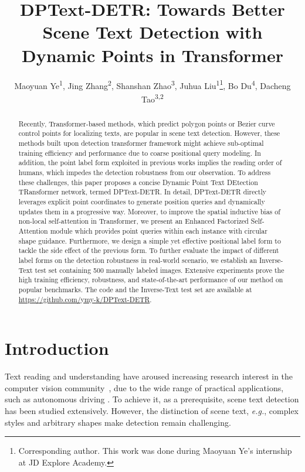 \documentclass[letterpaper]{article} \usepackage{aaai23}  \usepackage{times}  \usepackage{helvet}  \usepackage{courier}  \usepackage[hyphens]{url}  \usepackage{graphicx} \urlstyle{rm}
\title{
DPText-DETR: Towards Better Scene Text Detection with Dynamic Points in Transformer
}
\author {
    Maoyuan Ye\textsuperscript{\rm 1},
    Jing Zhang\textsuperscript{\rm 2},
    Shanshan Zhao\textsuperscript{\rm 3},
    Juhua Liu\textsuperscript{\rm 1}\footnote{Corresponding author. This work was done during Maoyuan Ye’s internship at JD Explore Academy.},
    Bo Du\textsuperscript{\rm 4}\footnotemark[1],
    Dacheng Tao\textsuperscript{\rm 3,2}
}
\begin{document}
\maketitle

\begin{abstract}
Recently, Transformer-based methods, which predict polygon points or Bezier curve control points for localizing texts, are popular in scene text detection. 
However, these methods built upon detection transformer framework might achieve sub-optimal training efficiency and performance due to coarse positional query modeling. 
In addition, the point label form exploited in previous works implies the reading order of humans, which impedes the detection robustness from our observation.
To address these challenges, this paper proposes a concise Dynamic Point Text DEtection TRansformer network, termed DPText-DETR. In detail, DPText-DETR directly leverages explicit point coordinates to generate position queries and dynamically updates them in a progressive way.
Moreover, to improve the spatial inductive bias of non-local self-attention in Transformer, we present an Enhanced Factorized Self-Attention module which provides point queries within each instance with circular shape guidance. Furthermore, we design a simple yet effective positional label form to tackle the side effect of the previous form. To further evaluate the impact of different label forms on the detection robustness in real-world scenario, we establish an Inverse-Text test set containing 500 manually labeled images. 
Extensive experiments prove the high training efficiency, robustness, and state-of-the-art performance of our method on popular benchmarks. 
The code and the Inverse-Text test set are available at \url{https://github.com/ymy-k/DPText-DETR}.
\end{abstract}



\section{Introduction}
\label{sec:intro}
Text reading and understanding have aroused increasing research interest in the computer vision community~\cite{liao2019mask,liao2020mask,liu2020abcnet,9525302,zhang2020trie,singh2019towards,he2022visual,du2022i3cl,liu2020asts,qiao2021mango,zhou2021tdi}, due to the wide range of practical applications, such as autonomous driving \cite{zhang2020empowering}. To achieve it, as a prerequisite, scene text detection has been studied extensively. However, the distinction of scene text, \emph{e.g.}, complex styles and arbitrary shapes make detection remain challenging.
\end{document}
